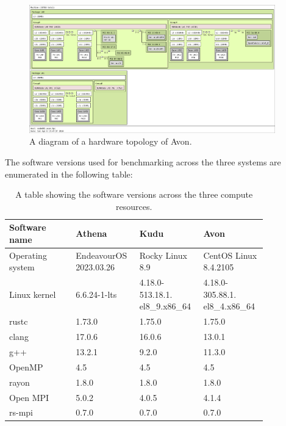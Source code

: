 \begin{figure}[H]
    \centering
    \includegraphics[width=0.95\textwidth]{images/5_performance/avon-topology.png}
    \caption{A diagram of a hardware topology of Avon.}
    \label{fig:avon-topology}
\end{figure}

The software versions used for benchmarking across the three systems are enumerated in the following table:

\begin{table}[H]
    \caption{A table showing the software versions across the three compute resources.}
    \label{table:perfTools}
    \begin{tabular}{|p{0.24\linewidth}||p{0.2\linewidth}|p{0.2\linewidth}|p{0.2\linewidth}|}
    \hline
    \textbf{Software name} & \textbf{Athena} & \textbf{Kudu} & \textbf{Avon} \\
    \hline\hline
    Operating system & EndeavourOS 2023.03.26 & Rocky Linux 8.9                & CentOS Linux 8.4.2105          \\\hline
    Linux kernel     & 6.6.24-1-lts                     & 4.18.0-513.18.1. el8\_9.x86\_64 & 4.18.0-305.88.1. el8\_4.x86\_64 \\\hline
    rustc            & 1.73.0                           & 1.75.0                         & 1.75.0                         \\\hline
    clang            & 17.0.6                           & 16.0.6                         & 13.0.1                         \\\hline
    g++              & 13.2.1                           & 9.2.0                          & 11.3.0                         \\\hline
    OpenMP           & 4.5                              & 4.5                            & 4.5                            \\\hline
    rayon            & 1.8.0                            & 1.8.0                          & 1.8.0                          \\\hline
    Open MPI         & 5.0.2                            & 4.0.5                          & 4.1.4                          \\\hline
    rs-mpi           & 0.7.0                            & 0.7.0                          & 0.7.0                         \\\hline
    \end{tabular}
\end{table}


